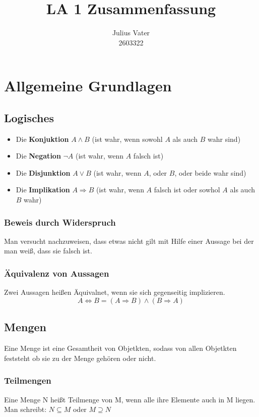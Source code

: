 \documentclass{kit}
\author{Julius Vater\\ 2603322}
\title{LA 1 Zusammenfassung}
\begin{document}
\maketitle
\pagebreak
\tableofcontents
\pagebreak
{}
\section{Allgemeine Grundlagen}
  \subsection{Logisches}
    \begin{itemize}
      \item Die \textbf{Konjuktion} $A\land B$ (ist wahr, wenn sowohl $A$ als auch $B$ wahr sind)
      \item Die \textbf{Negation} $\lnot A$ (ist wahr, wenn $A$ falsch ist)
      \item Die \textbf{Disjunktion} $A\lor B$ (ist wahr, wenn $A$, oder $B$, oder beide wahr sind)
      \item Die \textbf{Implikation} $A\Rightarrow B$ (ist wahr, wenn $A$ falsch ist oder sowhol $A$ als auch $B$ wahr)
    \end{itemize}
    \subsubsection{Beweis durch Widerspruch}
      Man versucht nachzuweisen, dass etwas nicht gilt mit Hilfe einer Aussage bei der man weiß, dass sie falsch ist.
    \subsubsection{Äquivalenz von Aussagen}
      Zwei Aussagen heißen Äquivalnet, wenn sie sich gegenseitig implizieren.
      \[A\Leftrightarrow B=(A\Rightarrow B)\land(B\Rightarrow A)\]
  \subsection{Mengen}
    Eine Menge ist eine Gesamtheit von Objetkten, sodass von allen Objetkten feststeht ob sie zu der Menge gehören oder nicht.
    \subsubsection{Teilmengen}
      Eine Menge N heißt Teilmenge von M, wenn alle ihre Elemente auch in M liegen.\\
      Man schreibt: $N\subseteq M$ oder $M\supseteq N$
\end{document}
